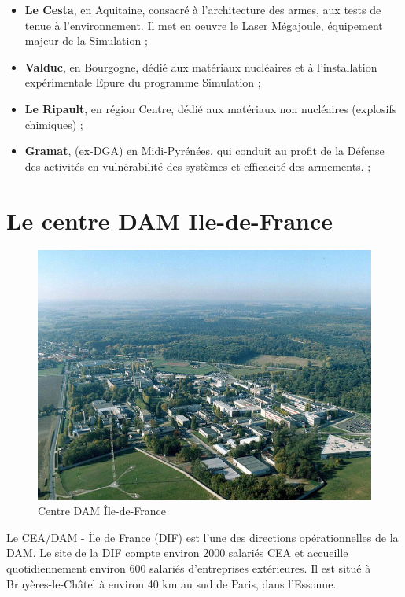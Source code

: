 \documentclass[12pt,a4paper,twoside]{article}
\begin{document}
    \begin{itemize}[label=\textbullet]
        \item
        {\bf Le Cesta}, en Aquitaine, consacré à l'architecture des armes, aux
        tests de tenue à l'environnement. Il met en oeuvre le Laser Mégajoule,
        équipement majeur de la Simulation ;
        \item
        {\bf Valduc}, en Bourgogne, dédié aux matériaux nucléaires et à
        l'installation expérimentale Epure du programme Simulation ;
        \item
        {\bf Le Ripault}, en région Centre, dédié aux matériaux non nucléaires
        (explosifs chimiques\textellipsis) ;
        \item
        {\bf Gramat}, (ex-DGA) en Midi-Pyrénées, qui conduit au profit de la
        Défense des activités en vulnérabilité des systèmes et efficacité des
        armements. ;
    \end{itemize}



    \newpage
    \section*{Le centre DAM Ile-de-France}
    \begin{figure}[H]
        \centering
        \includegraphics[scale=0.4]{ressources/images/dam/vue_aerienne.png}
        \caption*{Centre DAM Île-de-France}
    \end{figure}

    Le CEA/DAM - Île de France (DIF) est l'une des directions opérationnelles de la DAM. Le site de la DIF compte
    environ 2000 salariés CEA et accueille quotidiennement environ 600 salariés d'entreprises extérieures. Il est
    situé à Bruyères-le-Châtel à environ 40 km au sud de Paris, dans l'Essonne.
\end{document}
